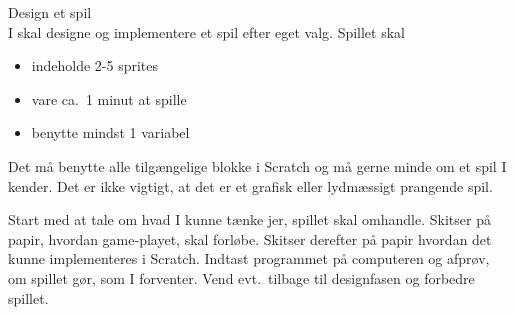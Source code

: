 Design et spil\\
I skal designe og implementere et spil efter eget valg. Spillet skal
\begin{itemize}
\item indeholde 2-5 sprites 
\item vare ca.\ 1 minut at spille 
\item benytte mindst 1 variabel
\end{itemize}
Det må benytte alle tilgængelige blokke i Scratch og må gerne minde om et spil I kender. Det er ikke vigtigt, at det er et grafisk eller lydmæssigt prangende spil.

Start med at tale om hvad I kunne tænke jer, spillet skal omhandle. Skitser på papir, hvordan game-playet, skal forløbe. Skitser derefter på papir hvordan det kunne implementeres i Scratch. Indtast programmet på computeren og afprøv, om spillet gør, som I forventer. Vend evt.\ tilbage til designfasen og forbedre spillet.
